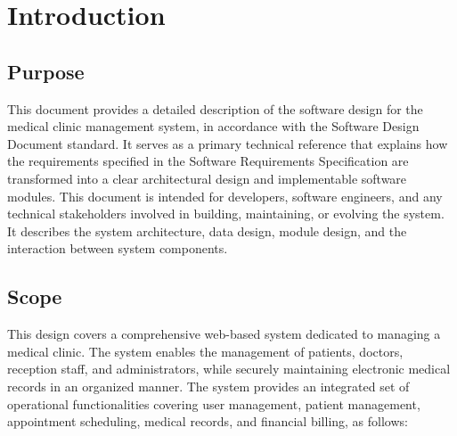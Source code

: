 \section{Introduction}

\subsection{Purpose}

This document provides a detailed description of the software design for the medical clinic management system, in accordance with the Software Design Document standard.
It serves as a primary technical reference that explains how the requirements specified in the Software Requirements Specification are transformed into a clear architectural design and implementable software modules.
This document is intended for developers, software engineers, and any technical stakeholders involved in building, maintaining, or evolving the system. It describes the system architecture, data design, module design, and the interaction between system components.


\subsection{Scope}

This design covers a comprehensive web-based system dedicated to managing a medical clinic. The system enables the management of patients, doctors, reception staff, and administrators, while securely maintaining electronic medical records in an organized manner.
The system provides an integrated set of operational functionalities covering user management, patient management, appointment scheduling, medical records, and financial billing, as follows:


